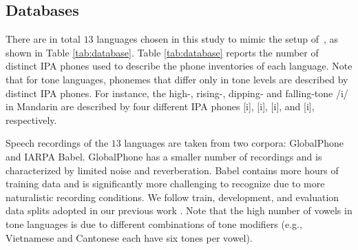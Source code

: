 \documentclass{article}
\begin{document}
\subsection{Databases}
There are in total $13$ languages chosen in this study to mimic the setup of~\cite{Zelasko2020That}, as shown in Table \ref{tab:database}. Table \ref{tab:database} reports the number of distinct IPA phones \cite{international1999handbook} used to describe the phone inventories of each language. 
Note that for tone languages, phonemes that differ only in tone levels are described by distinct IPA phones. For instance, the high-, rising-, dipping- and falling-tone  /i/ in Mandarin are described by four different IPA phones [i], [i], [i], and [i], respectively.   %

Speech recordings of the $13$ languages are taken from two corpora: GlobalPhone \cite{Schultz02globalphone} and IARPA Babel.
GlobalPhone has a smaller number of recordings and is characterized by limited noise and reverberation. Babel contains more hours of training data and is significantly more challenging to recognize due to more naturalistic recording conditions. We follow train, development, and evaluation data splits adopted in our previous work \cite{Zelasko2020That}. Note that the high number of vowels in tone languages is due to different combinations of tone modifiers (e.g., Vietnamese and Cantonese each have six tones per vowel).









\end{document}
